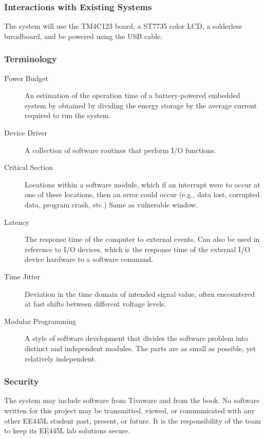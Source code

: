 \documentclass{article}
\begin{document}
		\subsubsection{Interactions with Existing Systems}
		The system will use the TM4C123 board, a ST7735 color LCD, a solderless breadboard, and be powered using the USB cable.	
	
		\subsubsection{Terminology}
			\begin{description}
				\item[Power Budget]
					An estimation of the operation time of a battery-powered embedded system by obtained by dividing the energy storage by the average current required to run the system.
				
				\item[Device Driver]
					A collection of software routines that perform I/O functions.			
			
				\item[Critical Section]
					Locations within a software module, which if an interrupt were to occur at one of these locations, then an error could occur (e.g., data lost, corrupted data, program crash, etc.) Same as vulnerable window.
				
				\item[Latency]
					The response time of the computer to external events. Can also be used in reference to I/O devices, which is the response time of the external I/O device hardware to a software command.
			
				\item[Time Jitter]
					Deviation in the time domain of intended signal value, often encountered at fast shifts between different voltage levels.
			
				\item[Modular Programming]
					A style of software development that divides the software problem into distinct and independent modules. The parts are as small as possible, yet relatively independent. 
			
			\end{description}
	
		\subsubsection{Security}
		The system may include software from Tivaware and from the book. No software written for this project may be transmitted, viewed, or communicated with any other EE445L student past, present, or future. It is the responsibility of the team to keep its EE445L lab solutions secure.
\end{document}
